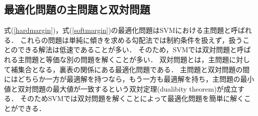 \documentclass[11pt,a4paper,titlepage]{ltjsarticle}
\begin{document}
\subsection{最適化問題の主問題と双対問題}
\label{sec:dual}
式(\ref{hardmargin})，式(\ref{softmargin})の最適化問題はSVMにおける主問題と呼ばれる．
これらの問題は単純に傾きを求める勾配法では制約条件を扱えず，扱うことのできる解法は低速であることが多い．
そのため，SVMでは双対問題と呼ばれる主問題と等価な別の問題を解くことが多い．
双対問題とは，主問題に対して補集合となる，裏表の関係にある最適化問題である．
主問題と双対問題の間にはどちらか一方が最適解を持つなら，もう一方も最適解を持ち，主問題の最小値と双対問題の最大値が一致するという双対定理(dualibity theorem)が成立する．
そのためSVMでは双対問題を解くことによって最適化問題を簡単に解くことができる\cite{dual-problem}．
\end{document}
